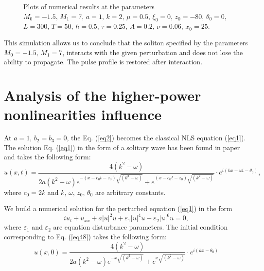 \documentclass[preprint,12pt]{elsarticle}
\begin{document}
\begin{figure}[H]
\begin{center}
\begin{minipage}[h]{0.48\linewidth}
\end{minipage}
\end{center}
\caption{Plots of numerical results at the parameters \(M_{0}=-1.5,\,M_{1}=7,\, a=1,\, k=2,\, \mu=0.5,\, \xi_{0}=0,\,z_{0}=-80,\, \theta_{0}=0\), \\
\(L=300,\, T=50,\, h=0.5,\, \tau=0.25,\,A=0.2,\,\nu=0.06,\, x_{0}=25\).}
\label{fig17}
\end{figure}
This simulation allows us to conclude that the soliton specified by the parameters \(M_{0}=-1.5,\,M_{1}=7\), interacts with the given perturbation and does not lose the ability to propagate. The pulse profile is restored after interaction.

\section{Analysis of the higher-power nonlinearities influence}\label{ch9}
At \(a=1,\, b_{2}=b_{3}=0\), the Eq. (\ref{eq2}) becomes the classical NLS equation (\ref{eq1}). The solution Eq. (\ref{eq1}) in the form of a solitary wave has been found in paper \cite{Rad2} and takes the following form:
\begin{equation} \label{eq48}
u(x,t)=\frac{4(k^{2}-\omega)}{2 a (k^{2}-\omega) e^{-\left(x-c_{0}t-z_{0}\right)\sqrt{(k^{2}-\omega)}}+e^{\left(x-c_{0}t-z_{0}\right)\sqrt{(k^{2}-\omega)}}}\cdot e^{i(kx-\omega t-\theta_{0})},
\end{equation}
where \(c_{0}=2k\) and \( k,\, \omega,\, z_{0},\, \theta_{0}\) are arbitrary constants.

We build a numerical solution for the perturbed equation (\ref{eq1}) in the form
\begin{equation}
iu_{t}+u_{xx}+a|u|^2 u+\varepsilon_{1}|u|^4 u+\varepsilon_{2}|u|^6 u=0,
\end{equation}
where \(\varepsilon_{1}\) and \(\varepsilon_{2}\) are equation disturbance parameters. The initial condition corresponding to Eq. (\ref{eq48}) takes the following form:
\begin{equation}\label{eq55}
u(x,0)=\frac{4(k^{2}-\omega)}{2 a (k^{2}-\omega) e^{-x\sqrt{(k^{2}-\omega)}}+e^{x\sqrt{(k^{2}-\omega)}}}\cdot e^{i(kx-\theta_{0})}
\end{equation}
\end{document}
